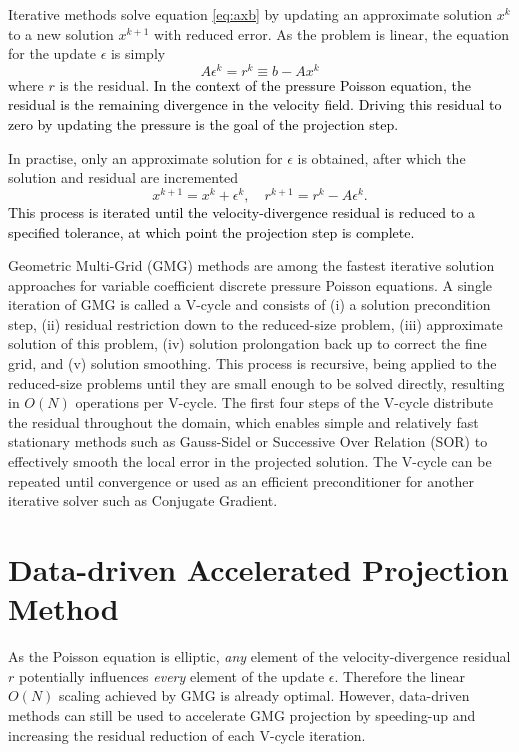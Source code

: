 \documentclass[]{elsarticle}
\begin{document}
Iterative methods solve equation \ref{eq:axb} by updating an approximate solution $x^k$ to a new solution $x^{k+1}$ with reduced error. As the problem is linear, the equation for the update $\epsilon$ is simply
\begin{equation}\label{eq:aer} 
    A \epsilon^k = r^k \equiv b - Ax^k
\end{equation}
where $r$ is the residual. \textcolor{black}{In the context of the pressure Poisson equation, the residual is the remaining divergence in the velocity field. Driving this residual to zero by updating the pressure is the goal of the projection step.} 

In practise, only an approximate solution for $\epsilon$ is obtained, after which the solution and residual are incremented
\begin{equation}\label{eq:increment}
    x^{k+1} = x^k+\epsilon^k, \quad r^{k+1} = r^k-A\epsilon^k.
\end{equation}
\textcolor{black}{This process is iterated until the velocity-divergence residual is reduced to a specified tolerance, at which point the projection step is complete.}

Geometric Multi-Grid (GMG) methods are among the fastest iterative solution approaches for variable coefficient discrete pressure Poisson equations. A single iteration of GMG is called a V-cycle and consists of (i) a solution precondition step, (ii) residual restriction down to the reduced-size problem, (iii) approximate solution of this problem, (iv) solution prolongation back up to correct the fine grid, and (v) solution smoothing. This process is recursive, being applied to the reduced-size problems until they are small enough to be solved directly, resulting in $O(N)$ operations per V-cycle.
The first four steps of the V-cycle distribute the residual throughout the domain, which enables simple and relatively fast stationary methods such as Gauss-Sidel or Successive Over Relation (SOR) to effectively smooth the local error in the projected solution. The V-cycle can be repeated until convergence or used as an efficient preconditioner for another iterative solver such as Conjugate Gradient. 

\section{Data-driven Accelerated Projection Method}

As the Poisson equation is elliptic, \textit{any} element of the velocity-divergence residual $r$ potentially influences \textit{every} element of the update $\epsilon$. Therefore the linear $O(N)$ scaling achieved by GMG is already optimal. However, data-driven methods can still be used to accelerate GMG projection by speeding-up and increasing the residual reduction of each V-cycle iteration.
\end{document}
